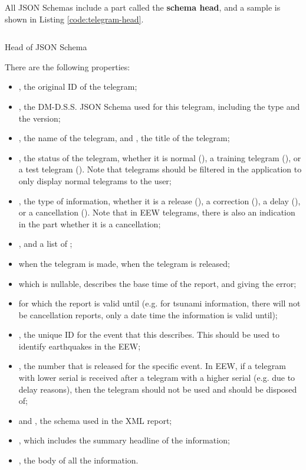 All JSON Schemas include a part called the \textbf{schema head}, and a sample is shown in Listing \ref{code:telegram-head}.

\begin{listing}
    \inputminted{json}{code/TelegramHead.json}
    \caption{Head of JSON Schema}
    \label{code:telegram-head}
\end{listing}

There are the following properties:
\begin{itemize}
    \item {}, the original ID of the telegram;
    \item {}, the DM-D.S.S. JSON Schema used for this telegram, including the type and the version;
    \item {}, the name of the telegram, and , the title of the telegram;
    \item {}, the status of the telegram, whether it is normal (), a training telegram (), or a test telegram (). Note that telegrams should be filtered in the application to only display normal telegrams to the user;
    \item {}, the type of information, whether it is a release (), a correction (), a delay (), or a cancellation (). Note that in EEW telegrams, there is also an indication in the  part whether it is a cancellation;
    \item {}, and a list of ;
    \item {} when the telegram is made,  when the telegram is released;
    \item {} which is nullable, describes the base time of the report, and  giving the error;
    \item {} for which the report is valid until (e.g. for tsunami information, there will not be cancellation reports, only a date time the information is valid until);
    \item {}, the unique ID for the event that this describes. This should be used to identify earthquakes in the EEW;
    \item {}, the number that is released for the specific event. In EEW, if a telegram with lower serial is received after a telegram with a higher serial (e.g. due to delay reasons), then the telegram should not be used and should be disposed of;
    \item {} and , the schema used in the XML report;
    \item {}, which includes the summary headline of the information;
    \item {}, the body of all the information.
\end{itemize}

